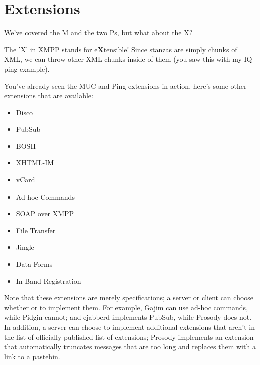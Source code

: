 \section{Extensions}

\pause

We've covered the M and the two Ps, but what about the X?

\pause

The 'X' in XMPP stands for e\textbf{X}tensible!  Since stanzas are simply chunks of XML,
we can throw other XML chunks inside of them (you saw this with my IQ ping example).

\pause
You've already seen the MUC and Ping extensions in action, here's some other extensions that
are available:

\pause
\begin{itemize}
\item Disco
\pause
\item PubSub
\pause
\item BOSH
\pause
\item XHTML-IM
\pause
\item vCard
\pause
\item Ad-hoc Commands
\pause
\item SOAP over XMPP
\pause
\item File Transfer
\pause
\item Jingle
\pause
\item Data Forms
\pause
\item In-Band Registration
\end{itemize}

\pause

Note that these extensions are merely specifications; a server or client can choose whether or to implement
them.  For example, Gajim can use ad-hoc commands, while Pidgin cannot; and ejabberd implements PubSub, while
Prosody does not.  In addition, a server can choose to implement additional extensions that aren't in the list
of officially published list of extensions; Prosody implements an extension that automatically truncates messages
that are too long and replaces them with a link to a pastebin.
